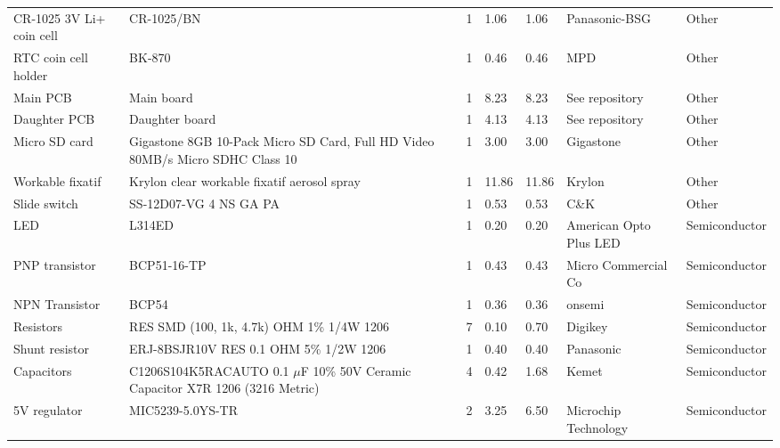 \documentclass[11pt,letterpaper]{article}
\begin{document}
\begin{longtable}{ p{1.75cm} p{4cm} p{1.25cm} p{1cm} p{1cm} p{2cm} p{2.5cm} }
	\rowcolor[gray]{0.925}
	CR-1025 3V Li+ coin cell & CR-1025/BN & 1 & 1.06 & 1.06 & Panasonic-BSG & Other \\
	
	RTC coin cell holder & BK-870 & 1 & 0.46 & 0.46 & MPD & Other \\
	
	\rowcolor[gray]{0.925}
	Main PCB & Main board & 1 & 8.23 & 8.23 & See repository & Other \\
	
	Daughter PCB & Daughter board & 1 & 4.13 & 4.13 & See repository & Other \\
	
	\rowcolor[gray]{0.925}
	Micro SD card & Gigastone 8GB 10-Pack Micro SD Card, Full HD Video 80MB/s Micro SDHC Class 10 & 1 & 3.00 & 3.00 & Gigastone & Other \\
	
	Workable fixatif & Krylon clear workable fixatif aerosol spray & 1 & 11.86 & 11.86 & Krylon & Other \\
	
	\rowcolor[gray]{0.925}
	Slide switch & SS-12D07-VG 4 NS GA PA & 1 & 0.53 & 0.53 & C\&K & Other \\
	
	LED & L314ED & 1 & 0.20 & 0.20 & American Opto Plus LED & Semiconductor \\
	
	\rowcolor[gray]{0.925}
	PNP transistor & BCP51-16-TP & 1 & 0.43 & 0.43 & Micro Commercial Co & Semiconductor \\
	
	NPN Transistor & BCP54 & 1 & 0.36 & 0.36 & onsemi & Semiconductor \\
	
	\rowcolor[gray]{0.925}
	Resistors & RES SMD (100, 1k, 4.7k) OHM 1\% 1/4W 1206 & 7 & 0.10 & 0.70 & Digikey & Semiconductor \\

	Shunt resistor & ERJ-8BSJR10V RES 0.1 OHM 5\% 1/2W 1206 & 1 & 0.40 & 0.40 & Panasonic & Semiconductor \\
	
	\rowcolor[gray]{0.925}
	Capacitors & C1206S104K5RACAUTO 0.1 $\mu$F 10\% 50V Ceramic Capacitor X7R 1206 (3216 Metric) & 4 & 0.42 & 1.68 & Kemet & Semiconductor \\

	5V regulator & MIC5239-5.0YS-TR & 2 & 3.25 & 6.50 & Microchip Technology & Semiconductor \\  
	

\end{longtable}
\end{document}
